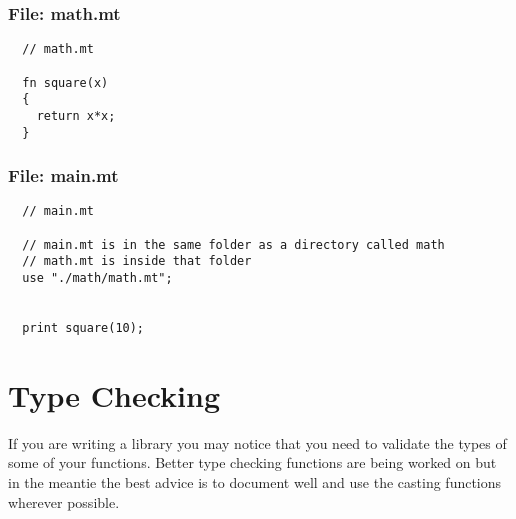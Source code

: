 \documentclass{report}
\begin{document}
\subsubsection{File: math.mt}
\begin{lstlisting}
  // math.mt

  fn square(x) 
  {
    return x*x;
  }
\end{lstlisting}

\subsubsection{File: main.mt}

\begin{lstlisting}
  // main.mt

  // main.mt is in the same folder as a directory called math
  // math.mt is inside that folder
  use "./math/math.mt";


  print square(10);
\end{lstlisting}

\section{Type Checking}

If you are writing a library you may notice that you need to validate the types of some of your functions. Better type checking functions are being worked on but in the meantie the best advice is to document well and use the casting functions wherever possible.
\end{document}
